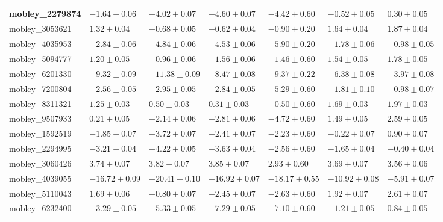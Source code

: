 \documentclass{article}
\begin{document}
\begin{landscape}
\begin{longtable}{|l{3.0cm}|l{3.0cm}|l{3.2cm}|l{3.6cm}|l{3.0cm}|l{3.0cm}|l{3.0cm}|}
mobley\_2279874	&	$	-1.64	\pm	0.06	$	&	$	-4.02	\pm	0.07	$	&	$	-4.60	\pm	0.07	$	&	$	-4.42	\pm	0.60	$	&	$	-0.52	\pm	0.05	$	&	$	0.30	\pm	0.05	$	\\ \hline
mobley\_3053621	&	$	1.32	\pm	0.04	$	&	$	-0.68	\pm	0.05	$	&	$	-0.62	\pm	0.04	$	&	$	-0.90	\pm	0.20	$	&	$	1.64	\pm	0.04	$	&	$	1.87	\pm	0.04	$	\\ \hline
mobley\_4035953	&	$	-2.84	\pm	0.06	$	&	$	-4.84	\pm	0.06	$	&	$	-4.53	\pm	0.06	$	&	$	-5.90	\pm	0.20	$	&	$	-1.78	\pm	0.06	$	&	$	-0.98	\pm	0.05	$	\\ \hline
mobley\_5094777	&	$	1.20	\pm	0.05	$	&	$	-0.96	\pm	0.06	$	&	$	-1.56	\pm	0.06	$	&	$	-1.46	\pm	0.60	$	&	$	1.54	\pm	0.05	$	&	$	1.78	\pm	0.05	$	\\ \hline
mobley\_6201330	&	$	-9.32	\pm	0.09	$	&	$	-11.38	\pm	0.09	$	&	$	-8.47	\pm	0.08	$	&	$	-9.37	\pm	0.22	$	&	$	-6.38	\pm	0.08	$	&	$	-3.97	\pm	0.08	$	\\ \hline
mobley\_7200804	&	$	-2.56	\pm	0.05	$	&	$	-2.95	\pm	0.05	$	&	$	-2.84	\pm	0.05	$	&	$	-5.29	\pm	0.60	$	&	$	-1.81	\pm	0.10	$	&	$	-0.98	\pm	0.07	$	\\ \hline
mobley\_8311321	&	$	1.25	\pm	0.03	$	&	$	0.50	\pm	0.03	$	&	$	0.31	\pm	0.03	$	&	$	-0.50	\pm	0.60	$	&	$	1.69	\pm	0.03	$	&	$	1.97	\pm	0.03	$	\\ \hline
mobley\_9507933	&	$	0.21	\pm	0.05	$	&	$	-2.14	\pm	0.06	$	&	$	-2.81	\pm	0.06	$	&	$	-4.72	\pm	0.60	$	&	$	1.49	\pm	0.05	$	&	$	2.59	\pm	0.05	$	\\ \hline
mobley\_1592519	&	$	-1.85	\pm	0.07	$	&	$	-3.72	\pm	0.07	$	&	$	-2.41	\pm	0.07	$	&	$	-2.23	\pm	0.60	$	&	$	-0.22	\pm	0.07	$	&	$	0.90	\pm	0.07	$	\\ \hline
mobley\_2294995	&	$	-3.21	\pm	0.04	$	&	$	-4.22	\pm	0.05	$	&	$	-3.63	\pm	0.04	$	&	$	-2.56	\pm	0.60	$	&	$	-1.65	\pm	0.04	$	&	$	-0.40	\pm	0.04	$	\\ \hline
mobley\_3060426	&	$	3.74	\pm	0.07	$	&	$	3.82	\pm	0.07	$	&	$	3.85	\pm	0.07	$	&	$	2.93	\pm	0.60	$	&	$	3.69	\pm	0.07	$	&	$	3.56	\pm	0.06	$	\\ \hline
mobley\_4039055	&	$	-16.72	\pm	0.09	$	&	$	-20.41	\pm	0.10	$	&	$	-16.92	\pm	0.07	$	&	$	-18.17	\pm	0.55	$	&	$	-10.92	\pm	0.08	$	&	$	-5.91	\pm	0.07	$	\\ \hline
mobley\_5110043	&	$	1.69	\pm	0.06	$	&	$	-0.80	\pm	0.07	$	&	$	-2.45	\pm	0.07	$	&	$	-2.63	\pm	0.60	$	&	$	1.92	\pm	0.07	$	&	$	2.61	\pm	0.07	$	\\ \hline
mobley\_6232400	&	$	-3.29	\pm	0.05	$	&	$	-5.33	\pm	0.05	$	&	$	-7.29	\pm	0.05	$	&	$	-7.10	\pm	0.60	$	&	$	-1.21	\pm	0.05	$	&	$	0.84	\pm	0.05	$	\\ \hline

\end{longtable}
\end{landscape}
\end{document}
